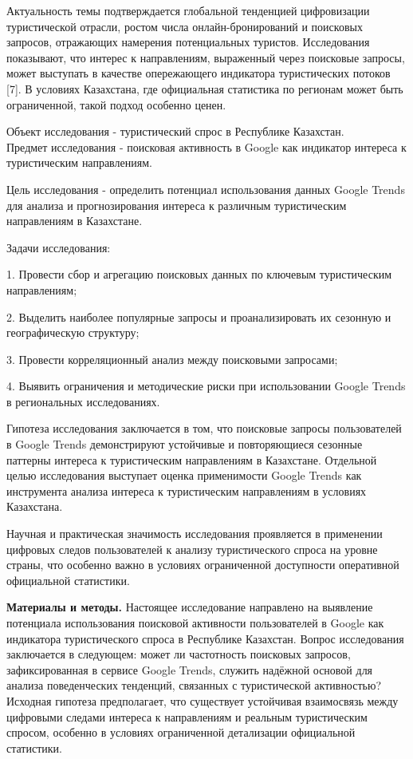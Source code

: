 \begin{multicols}{2}
Актуальность темы подтверждается глобальной тенденцией цифровизации
туристической отрасли, ростом числа онлайн-бронирований и поисковых
запросов, отражающих намерения потенциальных туристов. Исследования
показывают, что интерес к направлениям, выраженный через поисковые
запросы, может выступать в качестве опережающего индикатора
туристических потоков {[}7{]}. В условиях Казахстана, где официальная
статистика по регионам может быть ограниченной, такой подход особенно
ценен.

Объект исследования - туристический спрос в Республике Казахстан.\\
Предмет исследования - поисковая активность в Google как индикатор
интереса к туристическим направлениям.

Цель исследования - определить потенциал использования данных Google
Trends для анализа и прогнозирования интереса к различным туристическим
направлениям в Казахстане.

Задачи исследования:


1. Провести сбор и агрегацию поисковых данных по ключевым туристическим
направлениям;

2. Выделить наиболее популярные запросы и проанализировать их сезонную и
географическую структуру;

3. Провести корреляционный анализ между поисковыми запросами;

4. Выявить ограничения и методические риски при использовании Google
Trends в региональных исследованиях.

Гипотеза исследования заключается в том, что поисковые запросы
пользователей в Google Trends демонстрируют устойчивые и повторяющиеся
сезонные паттерны интереса к туристическим направлениям в Казахстане.
Отдельной целью исследования выступает оценка применимости Google Trends
как инструмента анализа интереса к туристическим направлениям в условиях
Казахстана.

Научная и практическая значимость исследования проявляется в применении
цифровых следов пользователей к анализу туристического спроса на уровне
страны, что особенно важно в условиях ограниченной доступности
оперативной официальной статистики.

{\bfseries Материалы и методы.} Настоящее исследование направлено на
выявление потенциала использования поисковой активности пользователей в
Google как индикатора туристического спроса в Республике Казахстан.
Вопрос исследования заключается в следующем: может ли частотность
поисковых запросов, зафиксированная в сервисе Google Trends, служить
надёжной основой для анализа поведенческих тенденций, связанных с
туристической активностью? Исходная гипотеза предполагает, что
существует устойчивая взаимосвязь между цифровыми следами интереса к
направлениям и реальным туристическим спросом, особенно в условиях
ограниченной детализации официальной статистики.


\end{multicols}
